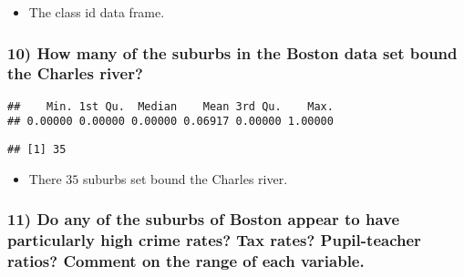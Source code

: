 \documentclass[
  12pt,
]{article}
\newenvironment{Shaded}{\begin{snugshade}}{\end{snugshade}}
\newcommand{\DecValTok}[1]{\textcolor[rgb]{0.00,0.00,0.81}{#1}}
\newcommand{\FunctionTok}[1]{\textcolor[rgb]{0.00,0.00,0.00}{#1}}
\newcommand{\NormalTok}[1]{#1}
\newcommand{\OtherTok}[1]{\textcolor[rgb]{0.56,0.35,0.01}{#1}}
\newcommand{\SpecialCharTok}[1]{\textcolor[rgb]{0.00,0.00,0.00}{#1}}
\providecommand{\tightlist}{%
  \setlength{\itemsep}{0pt}\setlength{\parskip}{0pt}}
\begin{document}
\begin{itemize}
\tightlist
\item
  The class id data frame.
\end{itemize}

\hypertarget{how-many-of-the-suburbs-in-the-boston-data-set-bound-the-charles-river}{%
\subsubsection{10) How many of the suburbs in the Boston data set bound
the Charles
river?}\label{how-many-of-the-suburbs-in-the-boston-data-set-bound-the-charles-river}}

\begin{Shaded}
\end{Shaded}

\begin{verbatim}
##    Min. 1st Qu.  Median    Mean 3rd Qu.    Max. 
## 0.00000 0.00000 0.00000 0.06917 0.00000 1.00000
\end{verbatim}

\begin{Shaded}
\end{Shaded}

\begin{verbatim}
## [1] 35
\end{verbatim}

\begin{itemize}
\tightlist
\item
  There \(35\) suburbs set bound the Charles river.
\end{itemize}

\hypertarget{do-any-of-the-suburbs-of-boston-appear-to-have-particularly-high-crime-rates-tax-rates-pupil-teacher-ratios-comment-on-the-range-of-each-variable.}{%
\subsubsection{11) Do any of the suburbs of Boston appear to have
particularly high crime rates? Tax rates? Pupil-teacher ratios? Comment
on the range of each
variable.}\label{do-any-of-the-suburbs-of-boston-appear-to-have-particularly-high-crime-rates-tax-rates-pupil-teacher-ratios-comment-on-the-range-of-each-variable.}}
\end{document}
